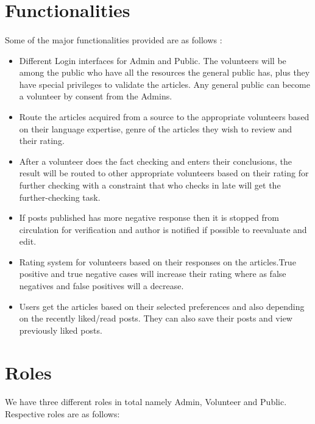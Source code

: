 \documentclass[titlepage,12pt]{article}
\begin{document}
\section{Functionalities}
\paragraph{}
Some of the major functionalities provided are as follows :
\begin{itemize}
    \item Different Login interfaces for Admin and Public. The volunteers will be among the public who have all the resources the general public has, plus they have special privileges to validate the articles. Any general public can become a volunteer by consent from the Admins.
    \item Route the articles acquired from a source to the appropriate volunteers based on their language expertise, genre of the articles they wish to review and their rating.
    \item After a volunteer does the fact checking and enters their conclusions, the result will be routed to other appropriate volunteers based on their rating for further checking with a constraint that who checks in late will get the further-checking task.
    \item If posts published has more negative response then it is stopped from circulation for verification and author is notified if possible to reevaluate and edit. 
    \item Rating system for volunteers based on their responses on the articles.True positive and true negative cases will increase their rating where as false negatives and false positives will a decrease.
    
    \item Users get the articles based on their selected preferences and also depending on the recently liked/read posts. They can also save their posts and view previously liked posts.
\end{itemize}

\section{Roles}
    \paragraph{}
    We have three different roles in total namely Admin, Volunteer and Public. Respective roles are as follows:
\end{document}
